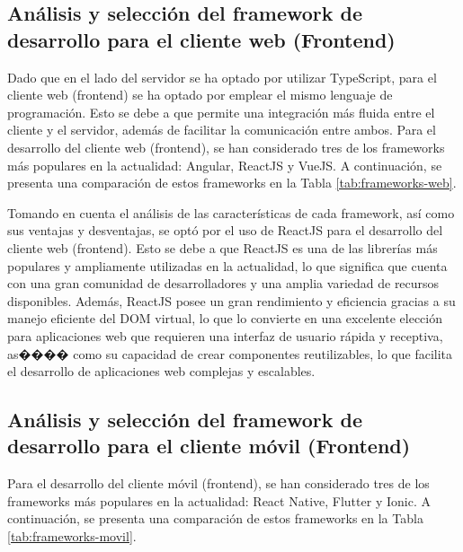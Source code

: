 \subsection{Análisis y selección del framework de desarrollo para el cliente web (Frontend)}

Dado que en el lado del servidor se ha optado por utilizar TypeScript, para el cliente web (frontend) se ha optado
por emplear el mismo lenguaje de programación. Esto se debe a que permite una integración más fluida entre el
cliente y el servidor, además de facilitar la comunicación entre ambos. Para el desarrollo del cliente web
(frontend), se han considerado tres de los frameworks más populares en la actualidad: Angular, ReactJS y VueJS.
A continuación, se presenta una comparación de estos frameworks en la Tabla \ref{tab:frameworks-web}.






Tomando en cuenta el análisis de las características de cada framework, así como sus ventajas y desventajas, se
optó por el uso de ReactJS para el desarrollo del cliente web (frontend). Esto se debe a que ReactJS es una de
las librerías más populares y ampliamente utilizadas en la actualidad, lo que significa que cuenta con una gran
comunidad de desarrolladores y una amplia variedad de recursos disponibles. Además, ReactJS posee un gran
rendimiento y eficiencia gracias a su manejo eficiente del DOM virtual, lo que lo convierte en una excelente
elección para aplicaciones web que requieren una interfaz de usuario rápida y receptiva, as���� como su capacidad
de crear componentes reutilizables, lo que facilita el desarrollo de aplicaciones web complejas y escalables.

\subsection{Análisis y selección del framework de desarrollo para el cliente móvil (Frontend)}

Para el desarrollo del cliente móvil (frontend), se han considerado tres de los frameworks más populares en la
actualidad: React Native, Flutter y Ionic. A continuación, se presenta una comparación de estos frameworks en la
Tabla \ref{tab:frameworks-movil}.



